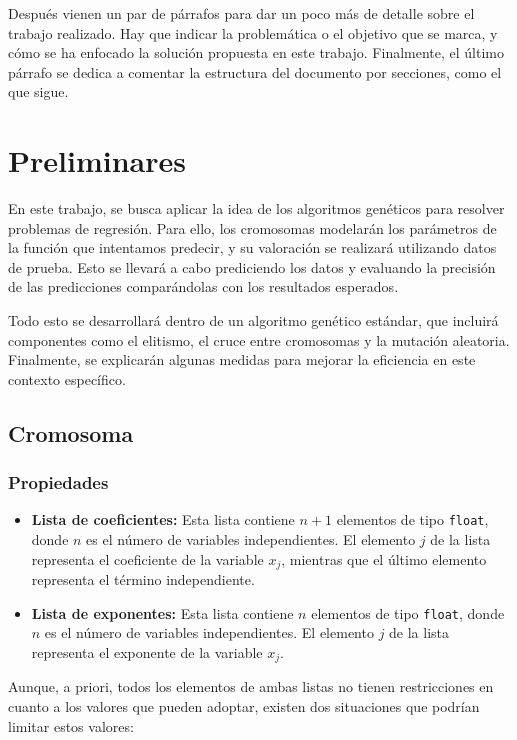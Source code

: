 \documentclass[conference,a4paper]{IEEEtran}
\begin{document}
Después vienen un par de párrafos para dar un poco más de detalle sobre el
trabajo realizado. Hay que indicar la problemática o el objetivo que se marca,
y cómo se ha enfocado la solución propuesta en este trabajo. Finalmente, el
último párrafo se dedica a comentar la estructura del documento por secciones,
como el que sigue.

\section{Preliminares}

En este trabajo, se busca aplicar la idea de los algoritmos genéticos para resolver problemas de regresión. Para ello, los cromosomas modelarán los parámetros de la función que intentamos predecir, y su valoración se realizará utilizando datos de prueba. Esto se llevará a cabo prediciendo los datos y evaluando la precisión de las predicciones comparándolas con los resultados esperados.

Todo esto se desarrollará dentro de un algoritmo genético estándar, que incluirá componentes como el elitismo, el cruce entre cromosomas y la mutación aleatoria. Finalmente, se explicarán algunas medidas para mejorar la eficiencia en este contexto específico.

\subsection{Cromosoma}

\subsubsection{Propiedades}
\begin{itemize}
    \item \textbf{Lista de coeficientes:} Esta lista contiene \( n + 1 \) elementos de tipo \texttt{float}, donde \( n \) es el número de variables independientes. El elemento \( j \) de la lista representa el coeficiente de la variable \( x_j \), mientras que el último elemento representa el término independiente.
    \item \textbf{Lista de exponentes:} Esta lista contiene \( n \) elementos de tipo \texttt{float}, donde \( n \) es el número de variables independientes. El elemento \( j \) de la lista representa el exponente de la variable \( x_j \).
\end{itemize}

Aunque, a priori, todos los elementos de ambas listas no tienen restricciones en cuanto a los valores que pueden adoptar, existen dos situaciones que podrían limitar estos valores:
\end{document}
